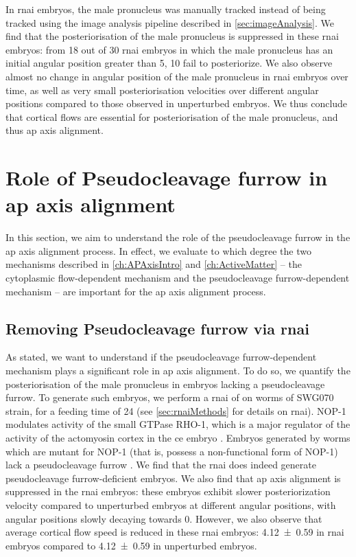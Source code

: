 In  \ac{rnai} embryos, the male pronucleus was manually tracked instead of being tracked using the image analysis pipeline described in \autoref{sec:imageAnalysis}. We find that the posteriorisation of the male pronucleus is suppressed in these \ac{rnai} embryos: from \num{18} out of \num{30} \ac{rnai} embryos in which the male pronucleus has an initial angular position greater than \SI{5}{\unitAngle}, \num{10} fail to posteriorize. We also observe almost no change in angular position of the male pronucleus in \ac{rnai} embryos over time, as well as very small posteriorisation velocities over different angular positions compared to those observed in unperturbed embryos. We thus conclude that cortical flows are essential for posteriorisation of the male pronucleus, and thus \ac{ap} axis alignment.

\section{Role of Pseudocleavage furrow in \acs{ap} axis alignment}\label{sec:PcFurrowRole}
In this section, we aim to understand the role of the pseudocleavage furrow in the \ac{ap} axis alignment process. In effect, we evaluate to which degree the two mechanisms described in \autoref{ch:APAxisIntro} and \autoref{ch:ActiveMatter} -- the cytoplasmic flow-dependent mechanism and the pseudocleavage furrow-dependent mechanism -- are important for the \ac{ap} axis alignment process. 

\subsection{Removing Pseudocleavage furrow via \acs{rnai}}\label{subsec:Nop1AndNop1Mel11}
As stated, we want to understand if the pseudocleavage furrow-dependent mechanism plays a significant role in \ac{ap} axis alignment. To do so, we quantify the posteriorisation of the male pronucleus in embryos lacking a pseudocleavage furrow. To generate such embryos, we perform a \ac{rnai} of  on worms of SWG070 strain, for a feeding time of \SI{24}{\unitRNAiTime} (see \autoref{sec:rnaiMethods} for details on \ac{rnai}). NOP-1 modulates activity of the small GTPase RHO-1, which is a major regulator of the activity of the actomyosin cortex in the \ac{ce} embryo \citep{tse2012nop1}. Embryos generated by worms which are mutant for NOP-1 (that is, possess a non-functional form of NOP-1) lack a pseudocleavage furrow \citep{rose1995pseudocleavage}. We find that the \ac{rnai} does indeed generate pseudocleavage furrow-deficient embryos. We also find that \ac{ap} axis alignment is suppressed in the  \ac{rnai} embryos: these embryos exhibit slower posteriorization velocity compared to unperturbed embryos at different angular positions, with angular positions slowly decaying towards \SI{0}{\unitAngle}. However, we also observe that average cortical flow speed is reduced in these \ac{rnai} embryos: \SI{4.12 +- 0.59}{\unitCrtxVel} in \ac{rnai} embryos compared to \SI{4.12 +- 0.59}{\unitCrtxVel} in unperturbed embryos.

